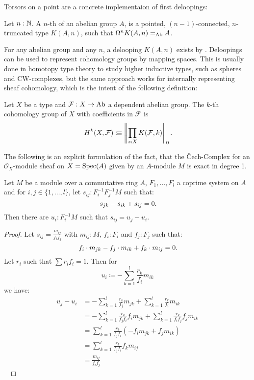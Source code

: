 Torsors on a point are a concrete implementaion of first deloopings:

\begin{definition}
  \label{delooping}
  Let $n:\mathbb{N}$.
  A $n$-th  of an abelian group $A$,
  is a pointed, $(n-1)$-connected, $n$-truncated type $K(A,n)$,
  such that $\Omega^nK(A,n)=_{\operatorname{Ab}}A$.
\end{definition}

For any abelian group and any $n$, a delooping $K(A,n)$ exists by \cite{licata-finster}.
Deloopings can be used to represent cohomology groups by mapping spaces.
This is usually done in homotopy type theory to study higher inductive types, such as spheres and CW-complexes,
but the same approach works for internally representing sheaf cohomology,
which is the intent of the following definition:

\begin{definition}
  \label{cohomology}
  Let $X$ be a type and $\mathcal F:X\to\operatorname{Ab}$ a dependent abelian group.
  The $k$-th cohomology group of $X$ with coefficients in $\mathcal F$ is
  \[
    H^k(X,\mathcal F)\colonequiv \left\|\prod_{x:X}K(\mathcal F,k)\right\|_0\rlap{.}
  \]
\end{definition}


The following is an explicit formulation of the fact, that the Čech-Complex for an
$\mathcal{O}_X$-module sheaf on $X=\operatorname{Spec}(A)$ given by an $A$-module $M$ is exact in degree 1.
\begin{lemma}%
  \label{H1-algebra}
  Let $M$ be a module over a commutative ring $A$, $F_1,\dots,F_l$ a coprime system on $A$
  and for $i,j\in\{1,\dots,l\}$, let $s_{ij} : F_i^{-1} F_j^{-1} M$ such that:
  \[ s_{jk}-s_{ik}+s_{ij}=0 \rlap{.}\]
  Then there are $u_i:F_i^{-1}M$ such that $s_{ij}=u_j - u_i$.
\end{lemma}

\begin{proof}
  Let $s_{ij}=\frac{m_{ij}}{f_i f_j}$ with $m_{ij}:M$, $f_i:F_i$ and $f_j:F_j$ such that:
  \[ f_i\cdot m_{jk}-f_j\cdot m_{ik}+f_k\cdot m_{ij}=0 \rlap{.}\]
  Let $r_i$ such that $\sum r_i f_i =1$.
  Then for
  \[ u_i \coloneqq -\sum_{k=1}^l\frac{r_k}{f_i}m_{ik} \]
  we have:
  \begin{align*}
      u_j-u_i &= -\sum_{k=1}^l\frac{r_k}{f_j}m_{jk} + \sum_{k=1}^l\frac{r_k}{f_i}m_{ik} \\
              &= -\sum_{k=1}^l\frac{r_k}{f_j f_i}f_i m_{jk} + \sum_{k=1}^l\frac{r_k}{f_i f_j} f_j m_{ik} \\
              &= \sum_{k=1}^l\frac{r_k}{f_j f_i}(-f_i m_{jk} + f_j m_{ik}) \\
              &= \sum_{k=1}^l\frac{r_k}{f_j f_i}f_k m_{ij} \\
              &= \frac{m_{ij}}{f_i f_j}
  \end{align*}
  \ %
\end{proof}

